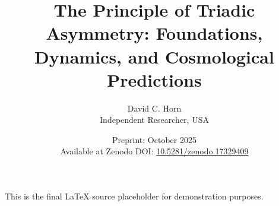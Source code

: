 \documentclass[11pt]{article}
\title{The Principle of Triadic Asymmetry: Foundations, Dynamics, and Cosmological Predictions}
\author{David C. Horn \\ \small Independent Researcher, USA}
\date{Preprint: October 2025 \\ \small Available at Zenodo DOI: \href{https://doi.org/10.5281/zenodo.17329409}{10.5281/zenodo.17329409}}
\begin{document}
\maketitle
This is the final LaTeX source placeholder for demonstration purposes.
\end{document}
